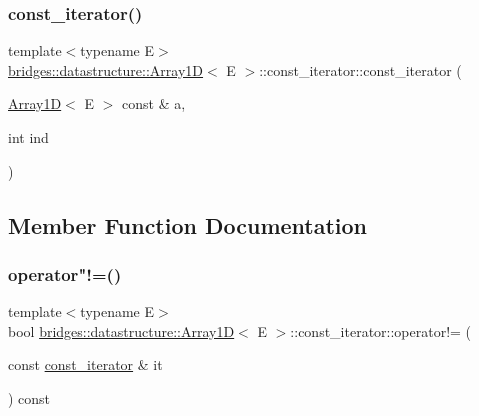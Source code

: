 \subsubsection{\texorpdfstring{const\+\_\+iterator()}{const\_iterator()}}
{\footnotesize\ttfamily template$<$typename E$>$ \\
\hyperlink{classbridges_1_1datastructure_1_1_array1_d}{bridges\+::datastructure\+::\+Array1D}$<$ E $>$\+::const\+\_\+iterator\+::const\+\_\+iterator (\begin{DoxyParamCaption}\item[{\hyperlink{classbridges_1_1datastructure_1_1_array1_d}{Array1D}$<$ E $>$ const \&}]{a,  }\item[{int}]{ind }\end{DoxyParamCaption})\hspace{0.3cm}{\ttfamily [inline]}}



\subsection{Member Function Documentation}
\mbox{\label{classbridges_1_1datastructure_1_1_array1_d_1_1const__iterator_ada463ec150271769b2a9e34c9bebdd05}} 
\subsubsection{\texorpdfstring{operator"!=()}{operator!=()}}
{\footnotesize\ttfamily template$<$typename E$>$ \\
bool \hyperlink{classbridges_1_1datastructure_1_1_array1_d}{bridges\+::datastructure\+::\+Array1D}$<$ E $>$\+::const\+\_\+iterator\+::operator!= (\begin{DoxyParamCaption}\item[{const \hyperlink{classbridges_1_1datastructure_1_1_array1_d_1_1const__iterator}{const\+\_\+iterator} \&}]{it }\end{DoxyParamCaption}) const\hspace{0.3cm}{\ttfamily [inline]}}

\mbox{\label{classbridges_1_1datastructure_1_1_array1_d_1_1const__iterator_aec062ef1375b53092b872838c415081f}} 
